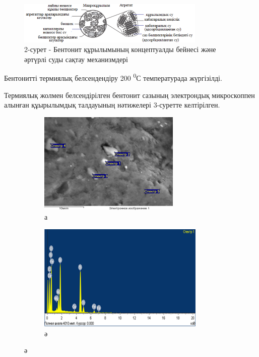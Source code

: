 \begin{figure}[H]
	\centering
	\includegraphics[width=0.8\textwidth]{assets/1044}
	\caption*{2-сурет - Бентонит құрылымының концептуалды бейнесі және әртүрлі суды сақтау механизмдері}
\end{figure}

Бентонитті термиялық белсендендіру 200 \textsuperscript{0}С
температурада жүргізілді.

Термиялық жолмен белсендірілген бентонит сазының электрондық
микроскоппен алынған құырылымдық талдауының нәтижелері 3-суретте
келтірілген.

\begin{figure}[H]
    \centering
    \begin{subfigure}[b]{0.45\textwidth}
        \centering
        \includegraphics[width=\textwidth]{assets/1045}
        \caption*{а}
    \end{subfigure}
    \hfill
    \begin{subfigure}[b]{0.45\textwidth}
        \centering
        \includegraphics[width=\textwidth]{assets/1045.1}
        \caption*{ә}
    \end{subfigure}
\end{figure}

